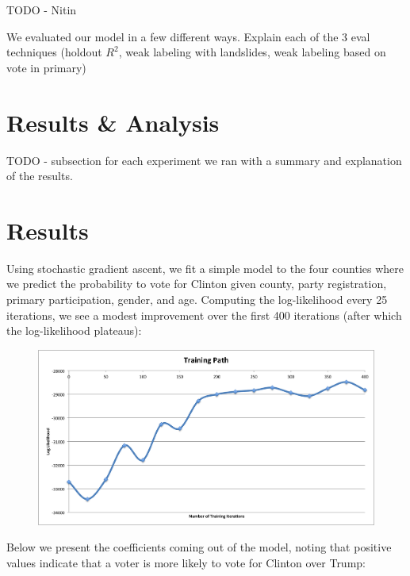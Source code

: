\documentclass[10pt, letterpaper]{article}
\begin{document}
TODO - Nitin

We evaluated our model in a few different ways. Explain each of the 3 eval techniques (holdout $R^2$, weak labeling with landslides, weak labeling based on vote in primary)

\section{Results \& Analysis}

TODO - subsection for each experiment we ran with a summary and explanation of the results.



\section{Results}

Using stochastic gradient ascent, we fit a simple model to the four counties where we predict the probability to vote for Clinton given county, party registration, primary participation, gender, and age. Computing the log-likelihood every 25 iterations, we see a modest improvement over the first 400 iterations (after which the log-likelihood plateaus): 
\begin{figure}[H]
\centering
\includegraphics[scale = 0.4]{TrainingPath}
\end{figure}

Below we present the coefficients coming out of the model, noting that positive values indicate that a voter is more likely to vote for Clinton over Trump:
\end{document}
